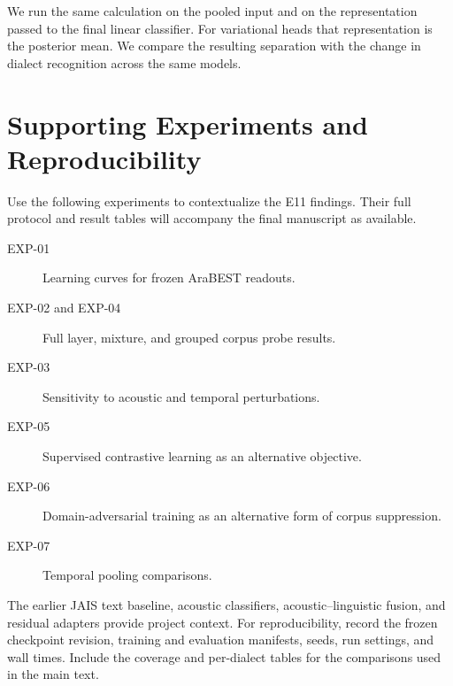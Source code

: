 \documentclass[11pt]{article}
\begin{document}
We run the same calculation on the pooled input and on the representation
passed to the final linear classifier. For variational heads that
representation is the posterior mean. We compare the resulting separation
with the change in dialect recognition across the same models.

\section{Supporting Experiments and Reproducibility}
Use the following experiments to contextualize the E11 findings. Their full protocol and result tables will accompany the final manuscript as available.

\begin{description}
  \item[EXP-01] Learning curves for frozen AraBEST readouts.
  \item[EXP-02 and EXP-04] Full layer, mixture, and grouped corpus probe results.
  \item[EXP-03] Sensitivity to acoustic and temporal perturbations.
  \item[EXP-05] Supervised contrastive learning as an alternative objective.
  \item[EXP-06] Domain-adversarial training as an alternative form of corpus suppression.
  \item[EXP-07] Temporal pooling comparisons.
\end{description}

The earlier JAIS text baseline, acoustic classifiers, acoustic--linguistic fusion, and residual adapters provide project context. For reproducibility, record the frozen checkpoint revision, training and evaluation manifests, seeds, run settings, and wall times. Include the coverage and per-dialect tables for the comparisons used in the main text.
\end{document}
